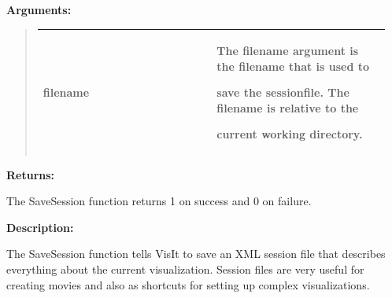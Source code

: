\documentclass[letterpaper,10pt,english]{sphinxmanual}
\begin{document}
\begin{DUlineblock}{0em}
\item[] 
\item[] \textbf{Arguments:}
\end{DUlineblock}
\begin{quote}

\begin{tabular}{|p{0.475\linewidth}|p{0.475\linewidth}|}
\hline

filename
 & 
\begin{DUlineblock}{0em}
\item[] The filename argument is the filename that is used to
\item[] save the sessionfile. The filename is relative to the
\item[] current working directory.
\end{DUlineblock}
\\
\hline\end{tabular}

\end{quote}

\begin{DUlineblock}{0em}
\item[] 
\item[] \textbf{Returns:}
\item[] The SaveSession function returns 1 on success and 0 on failure.
\item[] 
\item[] \textbf{Description:}
\item[] The SaveSession function tells VisIt to save an XML session file that
describes everything about the current visualization. Session files are
very useful for creating movies and also as shortcuts for setting up
complex visualizations.
\end{DUlineblock}

\begin{DUlineblock}{0em}
\item[] 
\end{DUlineblock}
\end{document}
